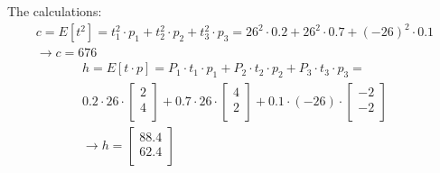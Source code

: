 The calculations:
\[ 
\begin{gathered}
	c = E[t^2] = t_1^2 \cdot p_1 + t_2^2 \cdot p_2 + t_3^2 \cdot p_3 = 26^2 \cdot 0.2 + 26^2 \cdot 0.7 + (-26)^2 \cdot 0.1\\
	\rightarrow c = 676
\end{gathered}
\]
\[
\begin{gathered}
h = E[t \cdot p] = P_1 \cdot t_1 \cdot p_1 + P_2 \cdot t_2 \cdot p_2 + P_3 \cdot t_3 \cdot p_3 = \\ 0.2 \cdot 26 \cdot \left[
\begin{array}{cc}  
	2 \\  
	4 \\
\end{array}
\right] + 0.7 \cdot 26 \cdot \left[ \begin{array}{cc}  
	4 \\  
	2 \\
\end{array}
\right] + 0.1 \cdot (-26) \cdot \left[ \begin{array}{cc}  
	-2 \\  
	-2 \\
\end{array}
\right] \\
\rightarrow h = \left[
	\begin{array}{c}  
		88.4 \\  
		62.4 \\
	\end{array}
	\right]
\end{gathered}
\]
\\
